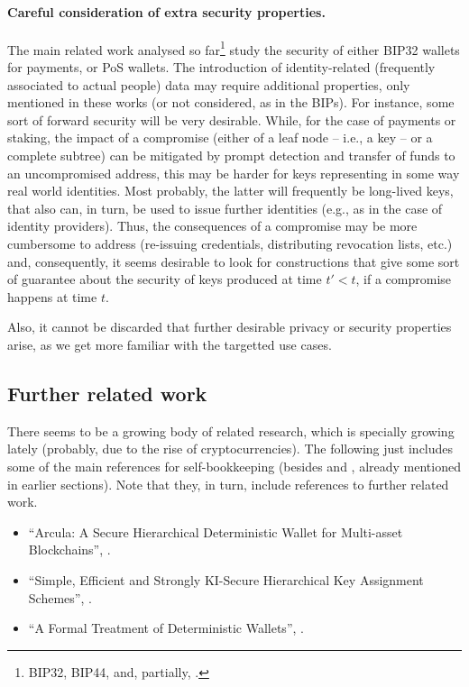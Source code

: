 \paragraph{Careful consideration of extra security properties.} %
The main related work analysed so far\footnote{BIP32, BIP44, \cite{def+21}
  and, partially, \cite{kkl20}.} study the security of either BIP32
wallets for payments, or PoS wallets. The introduction of identity-related
(frequently associated to actual people) data may require additional properties,
only mentioned in these works (or not considered, as in the BIPs). For instance,
some sort of forward security will be very desirable. While, for the case of
payments or staking, the impact of a compromise (either of a leaf node --
i.e., a key -- or a complete subtree) can be mitigated by prompt detection
and transfer of funds to an uncompromised address, this may be harder for
keys representing in some way real world identities. Most probably, the
latter will frequently be long-lived keys, that also can, in turn, be used
to issue further identities (e.g., as in the case of identity providers).
Thus, the consequences of a compromise may be more cumbersome to address
(re-issuing credentials, distributing revocation lists, etc.) and,
consequently, it seems desirable to look for constructions that give some
sort of guarantee about the security of keys produced at time $t' < t$, if a
compromise happens at time $t$.

Also, it cannot be discarded that further desirable privacy or security
properties arise, as we get more familiar with the targetted use cases.

  
\subsection{Further related work}

There seems to be a growing body of related research, which is specially
growing lately (probably, due to the rise of cryptocurrencies). The following
just includes some of the main references for self-bookkeeping (besides
\cite{kkl20} and \cite{def+21}, already mentioned in earlier sections). Note
that they, in turn, include references to further related work.

\begin{itemize}
\item ``Arcula: A Secure Hierarchical Deterministic Wallet for Multi-asset
  Blockchains'', \cite{lfa20}.
\item ``Simple, Efficient and Strongly KI-Secure Hierarchical Key Assignment
  Schemes'', \cite{fpp13}.
\item ``A Formal Treatment of Deterministic Wallets'', \cite{dfl19}.
\end{itemize}

